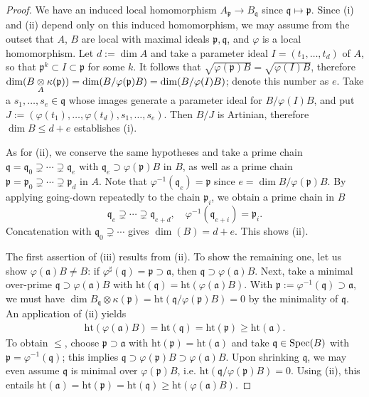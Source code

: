 \begin{proof}
	We have an induced local homomorphism $A_{\mathfrak{p}} \to B_{\mathfrak{q}}$ since $\mathfrak{q} \mapsto \mathfrak{p}$. Since (i) and (ii) depend only on this induced homomorphism, we may assume from the outset that $A$, $B$ are local with maximal ideals $\mathfrak{p}, \mathfrak{q}$, and $\varphi$ is a local homomorphism. Let $d := \dim A$ and take a parameter ideal $I = (t_1, \ldots, t_d)$ of $A$, so that $\mathfrak{p}^k \subset I \subset \mathfrak{p}$ for some $k$. It follows that $\sqrt{\varphi(\mathfrak{p}) B} = \sqrt{\varphi(I)B}$, therefore $\dim(B \underset{A}{\otimes} \kappa(\mathfrak{p})) = \dim(B/\varphi(\mathfrak{p})B) = \dim (B/\varphi(I)B)$; denote this number as $e$. Take a $s_1, \ldots, s_e \in \mathfrak{q}$ whose images generate a parameter ideal for $B/\varphi(I)B$, and put $J := (\varphi(t_1), \ldots, \varphi(t_d), s_1, \ldots, s_e)$. Then $B/J$ is Artinian, therefore $\dim B \leq d+e$ establishes (i).
	
	As for (ii), we conserve the same hypotheses and take a prime chain $\mathfrak{q} = \mathfrak{q}_0 \supsetneq \cdots \supsetneq \mathfrak{q}_e$ with $\mathfrak{q}_e \supset \varphi(\mathfrak{p})B$ in $B$, as well as a prime chain $\mathfrak{p} = \mathfrak{p}_0 \supsetneq \cdots \supsetneq \mathfrak{p}_d$ in $A$. Note that $\varphi^{-1}(\mathfrak{q}_e) = \mathfrak{p}$ since $e = \dim B/\varphi(\mathfrak{p})B$. By applying going-down repeatedly to the chain $\mathfrak{p}_i$, we obtain a prime chain in $B$
	\[ \mathfrak{q}_e \supsetneq \cdots \supsetneq \mathfrak{q}_{e+d}, \quad \varphi^{-1}(\mathfrak{q}_{e+i}) = \mathfrak{p}_i. \]
	Concatenation with $\mathfrak{q}_0 \supsetneq \cdots$ gives $\dim(B) = d + e$. This shows (ii).
	
	The first assertion of (iii) results from (ii). To show the remaining one, let us show $\varphi(\mathfrak{a})B \neq B$: if $\varphi^\sharp(\mathfrak{q}) = \mathfrak{p} \supset \mathfrak{a}$, then $\mathfrak{q} \supset \varphi(\mathfrak{a}) B$. Next, take a minimal over-prime $\mathfrak{q} \supset \varphi(\mathfrak{a})B$ with $\text{ht}(\mathfrak{q}) = \text{ht}(\varphi(\mathfrak{a})B)$. With $\mathfrak{p} := \varphi^{-1}(\mathfrak{q}) \supset \mathfrak{a}$, we must have $\dim B_{\mathfrak{q}} \otimes \kappa(\mathfrak{p}) = \text{ht}(\mathfrak{q}/\varphi(\mathfrak{p})B) = 0$ by the minimality of $\mathfrak{q}$. An application of (ii) yields
	\begin{gather*}
		\text{ht}(\varphi(\mathfrak{a})B) = \text{ht}(\mathfrak{q}) = \text{ht}(\mathfrak{p}) \geq \text{ht}(\mathfrak{a}).
	\end{gather*}
	To obtain $\leq$, choose $\mathfrak{p} \supset \mathfrak{a}$ with $\text{ht}(\mathfrak{p}) = \text{ht}(\mathfrak{a})$ and take $\mathfrak{q} \in \operatorname{Spec}(B)$ with $\mathfrak{p} = \varphi^{-1}(\mathfrak{q})$; this implies $\mathfrak{q} \supset \varphi(\mathfrak{p})B \supset \varphi(\mathfrak{a})B$. Upon shrinking $\mathfrak{q}$, we may even assume $\mathfrak{q}$ is minimal over $\varphi(\mathfrak{p})B$, i.e. $\text{ht}(\mathfrak{q}/ \varphi(\mathfrak{p})B) = 0$. Using (ii), this entails $\text{ht}(\mathfrak{a}) = \text{ht}(\mathfrak{p}) = \text{ht}(\mathfrak{q}) \geq \text{ht}(\varphi(\mathfrak{a})B)$.
\end{proof}

